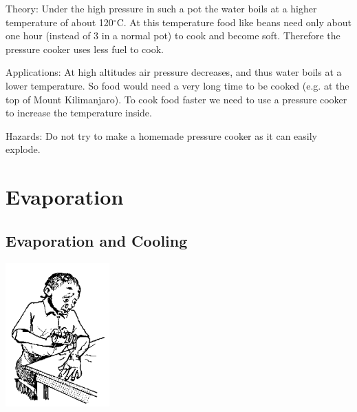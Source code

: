 \begin{multicols}{2}
\begin{description*}
\item[Theory:]{Under the high pressure in such a pot the water boils at a higher temperature of about 120$^\circ$C. At this temperature food like beans need only about one hour (instead of 3 in a normal pot) to cook and become soft. Therefore the pressure cooker uses less fuel to cook.}
\item[Applications:]{At high altitudes air pressure decreases, and thus water boils at a lower temperature. So food would need a very long time to be cooked (e.g. at the top of Mount Kilimanjaro). To cook food faster we need to use a pressure cooker to increase the temperature inside.}
\item[Hazards:]{Do not try to make a homemade pressure cooker as it can easily explode.}
\end{description*}

\columnbreak


\section*{Evaporation} 


\subsection{Evaporation and Cooling}

\begin{center}
\includegraphics[width=0.3\textwidth]{./img/source/evap-cooling.png}
\end{center}


\end{multicols}
